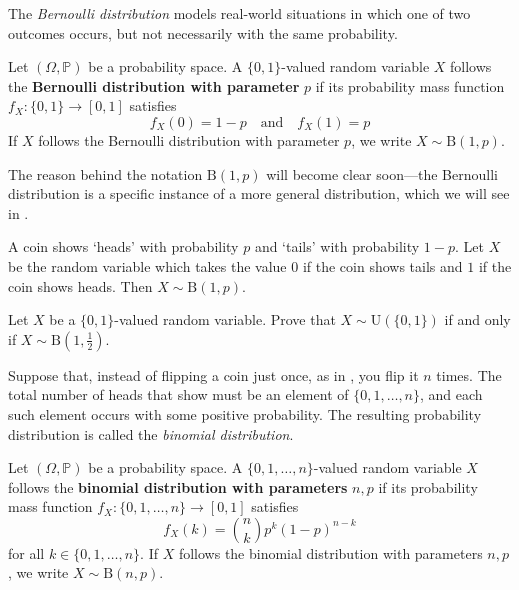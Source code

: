 The \textit{Bernoulli distribution} models real-world situations in which one of two outcomes occurs, but not necessarily with the same probability.

\begin{definition}
\label{defBernoulliDistribution}
Let $(\Omega,\mathbb{P})$ be a probability space. A $\{0,1\}$-valued random variable $X$ follows the \textbf{Bernoulli distribution with parameter} $p$ if its probability mass function $f_X : \{0,1\} \to [0,1]$ satisfies
\[ f_X(0)=1-p \quad \text{and} \quad f_X(1)=p \]
If $X$ follows the Bernoulli distribution with parameter $p$, we write $X \sim \mathrm{B}(1,p)$.
\end{definition}

The reason behind the notation $\mathrm{B}(1,p)$ will become clear soon---the Bernoulli distribution is a specific instance of a more general distribution, which we will see in .

\begin{example}
\label{exBernoulliCoinFlip}
A coin shows `heads' with probability $p$ and `tails' with probability $1-p$. Let $X$ be the random variable which takes the value $0$ if the coin shows tails and $1$ if the coin shows heads. Then $X \sim \mathrm{B}(1,p)$.
\end{example}

\begin{exercise}
Let $X$ be a $\{0,1\}$-valued random variable. Prove that $X \sim \mathrm{U}(\{0,1\})$ if and only if $X \sim \mathrm{B}(1,\frac{1}{2})$.
\end{exercise}

Suppose that, instead of flipping a coin just once, as in , you flip it $n$ times. The total number of heads that show must be an element of $\{0,1,\dots,n\}$, and each such element occurs with some positive probability. The resulting probability distribution is called the \textit{binomial distribution}.

\begin{definition}
\label{defBinomialDistribution}
Let $(\Omega,\mathbb{P})$ be a probability space. A $\{0,1,\dots,n\}$-valued random variable $X$ follows the \textbf{binomial distribution with parameters} $n,p$ if its probability mass function $f_X : \{0,1,\dots,n\} \to [0,1]$ satisfies
\[ f_X(k) = \binom{n}{k} p^k (1-p)^{n-k} \]
for all $k \in \{ 0,1,\dots,n \}$. If $X$ follows the binomial distribution with parameters $n,p$, we write $X \sim \mathrm{B}(n,p)$.
\end{definition}

